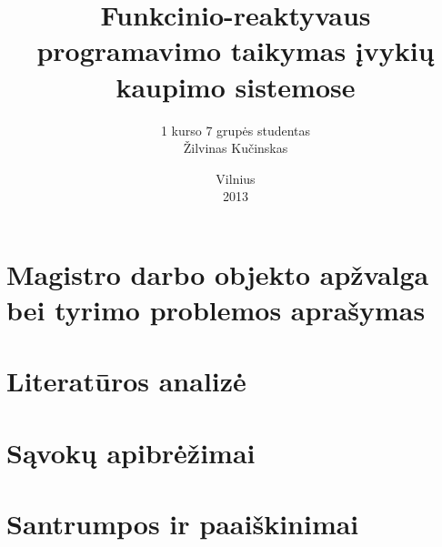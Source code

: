 \documentclass[12pt, a4paper, lithuanian]{article}
\title{Funkcinio-reaktyvaus programavimo taikymas įvykių kaupimo sistemose}
\author{
    1 kurso 7 grupės studentas \\
    Žilvinas Kučinskas
}
\date{Vilnius \\ 2013}
\begin{document}
\maketitle

\tableofcontents

\section{Magistro darbo objekto apžvalga bei tyrimo problemos aprašymas}


\section{Literatūros analizė}


\section{Sąvokų apibrėžimai}


\section{Santrumpos ir paaiškinimai}



\end{document}
